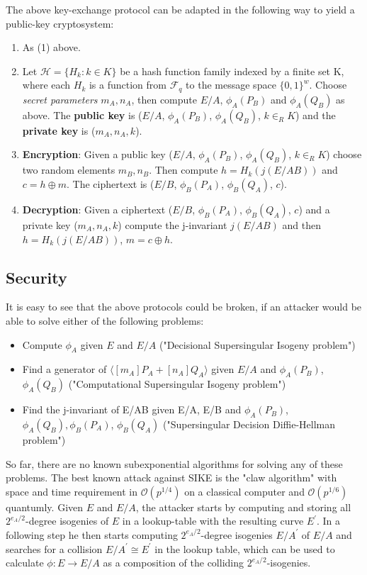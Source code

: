 The above key-exchange protocol can be adapted in the following way to yield a public-key cryptosystem: 
\begin{enumerate}[(1)]
	\item As (1) above.
	\item Let $\mathcal{H}= \{H_k:k\in K\}$ be a hash function family indexed by a finite set K, where each $H_k$ is a function from $\mathcal{F}_q$ to the message space $\{0,1\}^w$. Choose \textit{secret parameters} $m_A,n_A$, then compute $E/A$, $\phi_A(P_B)$ and $\phi_A(Q_B)$ as above. The \textbf{public key} is ($E/A$, $\phi_A(P_B)$, $\phi_A(Q_B)$, $k\in_R K$) and the \textbf{private key} is ($m_A,n_A,k$).
	\item \textbf{Encryption}: Given a public key ($E/A$, $\phi_A(P_B)$, $\phi_A(Q_B)$, $k\in_R K$) choose two random elements $m_B,n_B$. Then compute $h=H_k(j(E/AB))$ and $c=h\oplus m$. The ciphertext is ($E/B$, $\phi_B(P_A)$, $\phi_B(Q_A)$, $c$).
	\item \textbf{Decryption}: Given a ciphertext ($E/B$, $\phi_B(P_A)$, $\phi_B(Q_A)$, $c$) and a private key ($m_A,n_A,k$) compute the j-invariant $j(E/AB)$ and then $h = H_k(j(E/AB))$, $m=c\oplus h$.
\end{enumerate}

	
\subsection{Security}
It is easy to see that the above protocols could be broken, if an attacker would be able to solve either of the following problems:
	
	\begin{itemize}[\textbullet]
		\item Compute $\phi_A$ given $E$ and $E/A$ ("Decisional Supersingular Isogeny problem")
		\item Find a generator  of $\langle[m_A]P_A + [n_A]Q_A\rangle$ given $E/A$ and $\phi_A(P_B)$, $\phi_A(Q_B)$ ("Computational Supersingular Isogeny problem")
		\item Find the j-invariant of E/AB given E/A, E/B and $\phi_A(P_B)$, $\phi_A(Q_B),\phi_B(P_A)$, $\phi_B(Q_A)$ ("Supersingular Decision Diffie-Hellman problem")
	\end{itemize}

So far, there are no known subexponential algorithms for solving any of these problems. The best known attack against SIKE is the "claw algorithm" with space and time requirement in $\mathcal{O}(p^{1/4})$ on a classical computer and $\mathcal{O}(p^{1/6})$ quantumly. Given $E$ and $E/A$, the attacker starts by computing and storing all $2^{e_A/2}$-degree isogenies of $E$ in a lookup-table with the resulting curve $E^{\prime}$. In a following step he then starts computing $2^{e_A/2}$-degree isogenies $E/A^{\prime}$ of $E/A$ and searches for a collision $E/A^{\prime} \cong E^{\prime}$ in the lookup table, which can be used to calculate $\phi:E \to E/A$ as a composition of the colliding $2^{e_A/2}$-isogenies.\\

